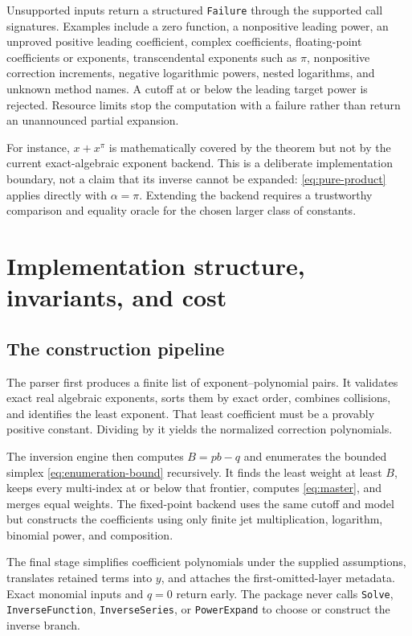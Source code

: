 \documentclass[11pt,a4paper]{article}
\numberwithin{equation}{section}
\theoremstyle{definition}\newtheorem{definition}[theorem]{Definition}
\theoremstyle{remark}\newtheorem{remark}[theorem]{Remark}
\newcommand{\code}[1]{\texttt{#1}}
\begin{document}
Unsupported inputs return a structured \code{Failure} through the
supported call signatures. Examples include a zero function, a
nonpositive leading power, an unproved positive leading coefficient,
complex coefficients, floating-point coefficients or exponents,
transcendental exponents such as $\pi$, nonpositive correction increments,
negative logarithmic powers, nested logarithms, and unknown method names.
A cutoff at or below the leading target power is rejected. Resource
limits stop the computation with a failure rather than return an
unannounced partial expansion.

For instance, $x+x^\pi$ is mathematically covered by the theorem but not
by the current exact-algebraic exponent backend. This is a deliberate
implementation boundary, not a claim that its inverse cannot be expanded:
\cref{eq:pure-product} applies directly with $\alpha=\pi$. Extending the
backend requires a trustworthy comparison and equality oracle for the
chosen larger class of constants.

\section{Implementation structure, invariants, and cost}
\label{sec:implementation}

\subsection{The construction pipeline}

The parser first produces a finite list of exponent--polynomial pairs.
It validates exact real algebraic exponents, sorts them by exact order,
combines collisions, and identifies the least exponent. That least
coefficient must be a provably positive constant. Dividing by it yields
the normalized correction polynomials.

The inversion engine then computes $B=pb-q$ and enumerates the bounded
simplex \cref{eq:enumeration-bound} recursively. It finds the least weight
at least $B$, keeps every multi-index at or below that frontier, computes
\cref{eq:master}, and merges equal weights. The fixed-point backend uses
the same cutoff and model but constructs the coefficients using only
finite jet multiplication, logarithm, binomial power, and composition.

The final stage simplifies coefficient polynomials under the supplied
assumptions, translates retained terms into $y$, and attaches the
first-omitted-layer metadata. Exact monomial inputs and $q=0$ return early.
The package never calls \code{Solve}, \code{InverseFunction},
\code{InverseSeries}, or \code{PowerExpand} to choose or construct the
inverse branch.
\end{document}
